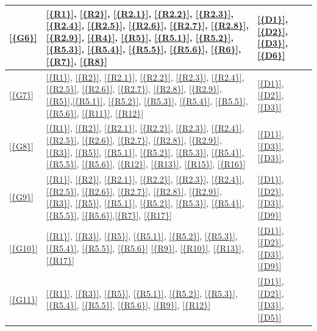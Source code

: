 \begin{table}[H]
\begin{tabular}{|l|p{8cm}|p{5cm}|}
            
            \ref{{G6}}
            &
            \ref{{R1}}, \ref{{R2}}, \ref{{R2.1}}, \ref{{R2.2}}, \ref{{R2.3}}, \ref{{R2.4}}, \ref{{R2.5}}, \ref{{R2.6}}, \ref{{R2.7}}, \ref{{R2.8}}, \ref{{R2.9}}, \ref{{R4}}, \ref{{R5}}, \ref{{R5.1}}, \ref{{R5.2}}, \ref{{R5.3}}, \ref{{R5.4}}, \ref{{R5.5}}, \ref{{R5.6}}, \ref{{R6}}, \ref{{R7}}, \ref{{R8}}
            &
            \ref{{D1}}, \ref{{D2}}, \ref{{D3}}, \ref{{D6}}                                \\\hline

            
            \ref{{G7}}
            & 
            \ref{{R1}}, \ref{{R2}}, \ref{{R2.1}}, \ref{{R2.2}}, \ref{{R2.3}}, \ref{{R2.4}}, \ref{{R2.5}}, \ref{{R2.6}}, \ref{{R2.7}}, \ref{{R2.8}}, \ref{{R2.9}}, \ref{{R5}},\ref{{R5.1}}, \ref{{R5.2}}, \ref{{R5.3}}, \ref{{R5.4}}, \ref{{R5.5}}, \ref{{R5.6}}, \ref{{R11}}, \ref{{R12}}
            & 
            \ref{{D1}}, \ref{{D2}}, \ref{{D3}}
            \\\hline

            
            \ref{{G8}}
            &
            \ref{{R1}}, \ref{{R2}}, \ref{{R2.1}}, \ref{{R2.2}}, \ref{{R2.3}}, \ref{{R2.4}}, \ref{{R2.5}}, \ref{{R2.6}}, \ref{{R2.7}}, \ref{{R2.8}}, \ref{{R2.9}}, \ref{{R3}}, \ref{{R5}}, \ref{{R5.1}}, \ref{{R5.2}}, \ref{{R5.3}}, \ref{{R5.4}}, \ref{{R5.5}}, \ref{{R5.6}}, \ref{{R12}}, \ref{{R13}}, \ref{{R15}}, \ref{{R16}}
            &
            \ref{{D1}}, \ref{{D3}}, \ref{{D3}}, 
            \\\hline

            
            \ref{{G9}}
            &
            \ref{{R1}}, \ref{{R2}}, \ref{{R2.1}}, \ref{{R2.2}}, \ref{{R2.3}}, \ref{{R2.4}}, \ref{{R2.5}}, \ref{{R2.6}}, \ref{{R2.7}}, \ref{{R2.8}}, \ref{{R2.9}}, \ref{{R3}}, \ref{{R5}}, \ref{{R5.1}}, \ref{{R5.2}}, \ref{{R5.3}}, \ref{{R5.4}}, \ref{{R5.5}}, \ref{{R5.6}},\ref{{R7}}, \ref{{R17}}
            &
            \ref{{D1}}, \ref{{D2}}, \ref{{D3}}, \ref{{D9}}                                \\\hline

            
            \ref{{G10}}
            &
            \ref{{R1}}, \ref{{R3}}, \ref{{R5}}, \ref{{R5.1}}, \ref{{R5.2}}, \ref{{R5.3}}, \ref{{R5.4}}, \ref{{R5.5}}, \ref{{R5.6}} \ref{{R9}}, \ref{{R10}}, \ref{{R13}}, \ref{{R17}}
            &
            \ref{{D1}}, \ref{{D2}}, \ref{{D3}}, \ref{{D9}}
            \\\hline

            
            \ref{{G11}}
            &
            \ref{{R1}}, \ref{{R3}}, \ref{{R5}}, \ref{{R5.1}}, \ref{{R5.2}}, \ref{{R5.3}}, \ref{{R5.4}}, \ref{{R5.5}}, \ref{{R5.6}},  \ref{{R9}}, \ref{{R12}}
            &
            \ref{{D1}}, \ref{{D2}}, \ref{{D3}}, \ref{{D5}}
            \\\hline
            

\end{tabular}
\end{table}
